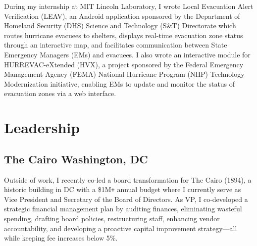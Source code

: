 \documentclass[]{article}
\def\Plus{\texttt{+}}
\begin{document}
During my internship at MIT Lincoln Laboratory, I wrote Local Evacuation Alert Verification (LEAV), an Android application sponsored by the Department of Homeland Security (DHS) Science and Technology (S\&T) Directorate which routes hurricane evacuees to shelters, displays real-time evacuation zone status through an interactive map, and facilitates communication between State Emergency Managers (EMs) and evacuees. I also wrote an interactive module for HURREVAC-eXtended (HVX), a project sponsored by the Federal Emergency Management Agency (FEMA) National Hurricane Program (NHP) Technology Modernization initiative, enabling EMs to update and monitor the status of evacuation zones via a web interface.

\section*{Leadership}

\subsection*{The Cairo \hfill \textnormal{Washington, DC}}

Outside of work, I recently co-led a board transformation for The Cairo (1894), a historic building in DC with a \$1M{\Plus} annual budget where I currently serve as Vice President and Secretary of the Board of Directors. As VP, I co-developed a strategic financial management plan by auditing finances, eliminating wasteful spending, drafting board policies, restructuring staff, enhancing vendor accountability, and developing a proactive capital improvement strategy—all while keeping fee increases below 5\%.

\end{document}
